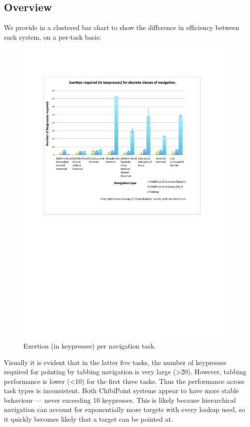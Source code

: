 \documentclass[11pt,openright,a4paper]{report}
\begin{document}
\subsection{Overview}
We provide in  a clustered bar chart to show the difference in efficiency between each system, on a per-task basis:
\begin{figure}[ht]
\centerline{\includegraphics[width=8in]{figures/Exertion2.pdf}}
\caption{Exertion (in keypresses) per navigation task.}
\label{fig:exertion}
\end{figure}
\FloatBarrier
Visually it is evident that in the latter five tasks, the number of keypresses required for pointing by tabbing navigation is very large (>20). However, tabbing performance is lower (<10) for the first three tasks. Thus the performance across task types is inconsistent. Both ChibiPoint systems appear to have more stable behaviour --- never exceeding 10 keypresses. This is likely because hierarchical navigation can account for exponentially more targets with every lookup used, so it quickly becomes likely that a target can be pointed at.
\end{document}
